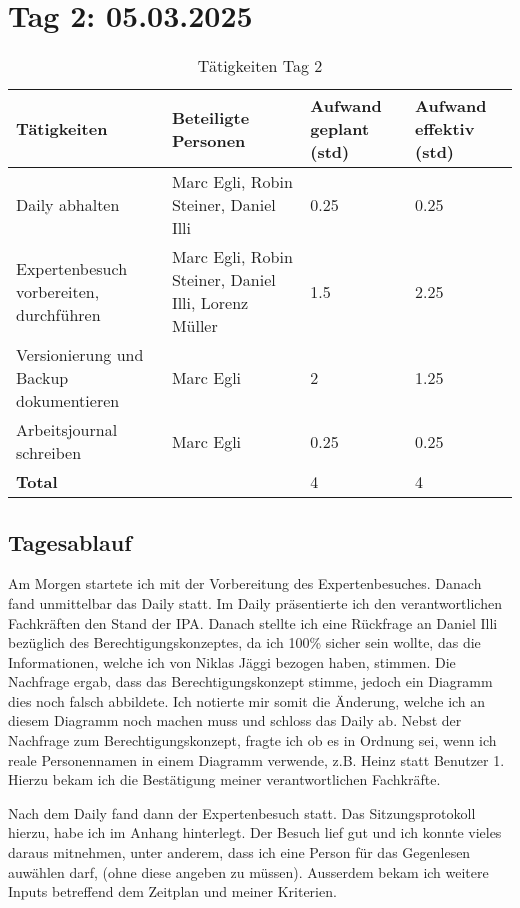 \section{Tag 2: 05.03.2025}
\begin{table}[H]
    \begin{tabular}{|L{0.4\textwidth}|C{60pt}|C{60pt}|C{60pt}|}
        \hline
        \color{white}Tätigkeiten & \color{white}Beteiligte \color{white}Personen & \color{white}Aufwand geplant (std) & \color{white}Aufwand effektiv (std) \\
         \hline
         Daily abhalten & Marc Egli, Robin Steiner, Daniel Illi & 0.25 & 0.25 \\
         \hline
         Expertenbesuch vorbereiten, durchführen & Marc Egli, Robin Steiner, Daniel Illi, Lorenz Müller & 1.5 & 2.25 \\
         \hline
         Versionierung und Backup dokumentieren & Marc Egli & 2 & 1.25 \\
         \hline
         Arbeitsjournal schreiben & Marc Egli & 0.25 & 0.25 \\
        \hline
        \textbf{Total} &  & 4 & 4 \\
        \hline
    \end{tabular}
    \caption{Tätigkeiten Tag 2}
\end{table}

\subsection*{Tagesablauf}
Am Morgen startete ich mit der Vorbereitung des Expertenbesuches. Danach fand unmittelbar das Daily statt.
Im Daily präsentierte ich den verantwortlichen Fachkräften den Stand der IPA. Danach stellte ich eine Rückfrage an Daniel Illi bezüglich des Berechtigungskonzeptes, da
ich 100\% sicher sein wollte, das die Informationen, welche ich von Niklas Jäggi bezogen haben, stimmen. Die Nachfrage ergab, dass das Berechtigungskonzept stimme, jedoch ein Diagramm
dies noch falsch abbildete. Ich notierte mir somit die Änderung, welche ich an diesem Diagramm noch machen muss und schloss das Daily ab.
Nebst der Nachfrage zum Berechtigungskonzept, fragte ich ob es in Ordnung sei, wenn ich reale Personennamen in einem Diagramm verwende, z.B. Heinz
statt Benutzer 1. Hierzu bekam ich die Bestätigung meiner verantwortlichen Fachkräfte.

Nach dem Daily fand dann der Expertenbesuch statt. Das Sitzungsprotokoll hierzu, habe ich im Anhang hinterlegt. Der Besuch lief gut und ich konnte vieles daraus mitnehmen,
unter anderem, dass ich eine Person für das Gegenlesen auwählen darf, (ohne diese angeben zu müssen). Ausserdem bekam ich weitere Inputs betreffend dem Zeitplan und meiner Kriterien.

